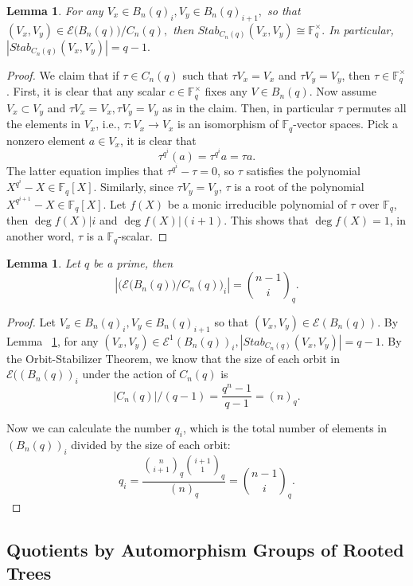 \documentclass[10 pt]{amsart}
\theoremstyle{plain}
\newtheorem{lem}[thm]{Lemma}
\theoremstyle{definition}
\theoremstyle{remark}
\numberwithin{equation}{section}
\newcommand\ssec{\subsection}
\newcommand\BF{{\mathbb F}}
\begin{document}
\begin{lem}
\label{lem:q_stabilizer}
For any $V_x \in B_n(q)_i,V_y \in B_n(q)_{i+1},$ so that $(V_x, V_y) \in \mathcal E \big(B_n(q)\big)/C_n(q),$ then $Stab_{C_n(q)}(V_x , V_y) \cong \BF_q^\times.$ In particular, $|Stab_{C_n(q)}(V_x , V_y)|=q-1.$ 
\end{lem}
\begin{proof}
We claim that if $\tau \in C_n(q)$ such that $\tau V_x = V_x$ and $\tau V_y = V_y$, then $\tau \in \BF_q^\times$. First, it is clear that any scalar $c \in \BF_q^\times$  fixes any $V \in B_n(q)$. Now assume $V_x \subset V_y$ and $\tau V_x = V_x, \tau V_y = V_y$ as in the claim. Then, in particular $\tau$ permutes all the elements in $V_x$, i.e., $\tau: V_x \rightarrow V_x$ is an isomorphism of $\BF_q$-vector spaces. Pick a nonzero element $a \in V_x$,  it is clear that $$\tau^{q^i} (a) = \tau^{q^i} a = \tau a.$$ The latter equation implies that $\tau^{q^i} - \tau = 0$, so $\tau$ satisfies the polynomial $X^{q^{i}} - X \in \BF_q[X]$. Similarly, since $\tau V_y = V_y$, $\tau$ is a root of the polynomial $X^{q^{i+1}} - X \in\BF_q[X].$  Let $f(X)$ be a monic irreducible polynomial of $\tau$ over $\BF_q$, then $\deg f(X) | i $ and $\deg f(X) | (i+1)$. This shows that $\deg f(X) = 1$, in another word, $\tau$ is a $\BF_q$-scalar. 
\end{proof}

\begin{lem} 
\label{lem:cyclic_q_analog_ranks}
Let $q$ be a prime,  then $$ |\big( \mathcal E \big(B_n(q)\big)/C_n(q) \big)_i| = {n-1 \choose i}_q.$$
\end{lem}

\begin{proof}

Let $V_x \in B_n(q)_i,V_y \in B_n(q)_{i+1}$ so that $(V_x, V_y) \in \mathcal E (B_n(q))$. By Lemma ~\ref{lem:q_stabilizer}, for any $(V_x, V_y) \in \mathcal E ^1 (B_n(q))_i,|Stab_{C_n(q)}(V_x, V_y)|=q-1.$  By the Orbit-Stabilizer Theorem, we know that the size of each orbit in $\mathcal E ((B_n(q))_i$ under the action of $C_n(q)$ is $$|C_n(q)|/(q-1) = \frac{q^n-1}{q-1} = (n)_q.$$

Now we can calculate the number $q_i$, which is the total number of elements in $(B_n(q))_i$ divided by the size of each orbit:$$q_i = \frac{{n \choose i+1}_q {i+1 \choose 1}_q}{(n)_q} = {n-1 \choose i}_q. $$
\end{proof}


\ssec{Quotients by Automorphism Groups of Rooted Trees}
\end{document}
